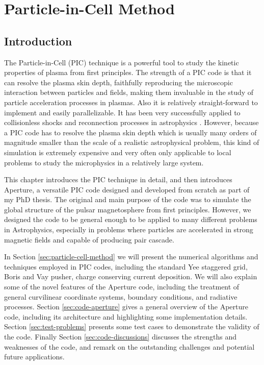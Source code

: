 
\chapter{Particle-in-Cell Method}
\label{chap:pic}

\section{Introduction}
\label{sec:introduction}

The Particle-in-Cell (PIC) technique is a powerful tool to study the kinetic
properties of plasma from first principles. The strength of a PIC code is that
it can resolve the plasma skin depth, faithfully reproducing the microscopic
interaction between particles and fields, making them invaluable in the study of
particle acceleration processes in plasmas. Also it is relatively
straight-forward to implement and easily parallelizable. It has been very
successfully applied to collisionless shocks and reconnection processes in
astrophysics
. However, because a PIC code has to resolve the
plasma skin depth which is usually many orders of magnitude smaller than the
scale of a realistic astrophysical problem, this kind of simulation is extremely
expensive and very often only applicable to local problems to study the
microphysics in a relatively large system.

This chapter introduces the PIC technique in detail, and then introduces
Aperture, a versatile PIC code designed and developed from scratch as part of my
PhD thesis. The original and main purpose of the code was to simulate the global
structure of the pulsar magnetosphere from first principles. However, we
designed the code to be general enough to be applied to many different problems
in Astrophysics, especially in problems where particles are accelerated in
strong magnetic fields and capable of producing pair cascade.

In Section \ref{sec:particle-cell-method} we will present the
numerical algorithms and techniques employed in PIC codes, including the
standard Yee staggered grid, Boris and Vay pusher, charge conserving current
deposition. We will also explain some of the novel features of the Aperture
code, including the treatment of general curvilinear coordinate systems,
boundary conditions, and radiative processes. Section \ref{sec:code-aperture}
gives a general overview of the Aperture code, including its architecture
and highlighting some implementation details. Section \ref{sec:test-problems}
presents some test cases to demonstrate the validity of the code. Finally
Section \ref{sec:code-discussions} discusses the strengths and
weaknesses of the code, and remark on the outstanding challenges and potential
future applications.

